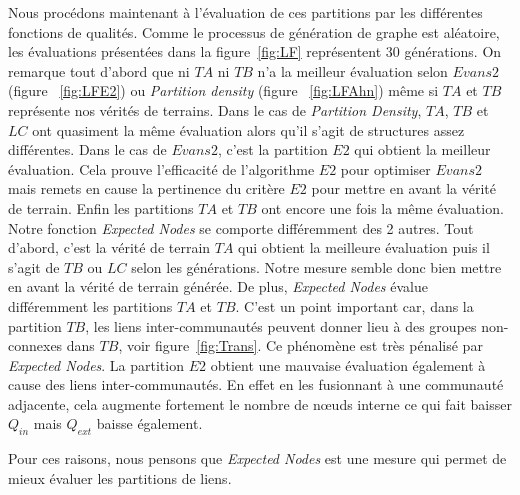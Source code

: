 Nous procédons maintenant à l'évaluation de ces partitions par les différentes fonctions de qualités.
Comme le processus de génération de graphe est aléatoire, les évaluations présentées dans la figure~\ref{fig:LF} représentent $30$ générations.
On remarque tout d'abord que ni $TA$ ni $TB$ n'a la meilleur évaluation selon $Evans2$ (figure ~\ref{fig:LFE2}) ou \emph{Partition density} (figure ~\ref{fig:LFAhn}) même si $TA$ et $TB$ représente nos vérités de terrains.
Dans le cas de \emph{Partition Density}, $TA$, $TB$ et $LC$ ont quasiment la même évaluation alors qu'il s'agit de structures assez différentes.
Dans le cas de $Evans2$, c'est la partition $E2$ qui obtient la meilleur évaluation.
Cela prouve l'efficacité de l'algorithme $E2$ pour optimiser $Evans2$ mais remets en cause la pertinence du critère $E2$ pour mettre en avant la vérité de terrain.
Enfin les partitions $TA$ et $TB$ ont encore une fois la même évaluation.
Notre fonction \emph{Expected Nodes} se comporte différemment des 2 autres.
Tout d'abord, c'est la vérité de terrain $TA$ qui obtient la meilleure évaluation puis il s'agit de $TB$ ou $LC$ selon les générations.
Notre mesure semble donc bien mettre en avant la vérité de terrain générée.
De plus, \emph{Expected Nodes} évalue différemment les partitions $TA$ et $TB$.
C'est un point important car, dans la partition $TB$, les liens inter-communautés peuvent donner lieu à des groupes non-connexes dans $TB$, voir figure~\ref{fig:Trans}.
Ce phénomène est très pénalisé par \emph{Expected Nodes}.
La partition $E2$ obtient une mauvaise évaluation également à cause des liens inter-communautés.
En effet en les fusionnant à une communauté adjacente, cela augmente fortement le nombre de n\oe uds interne ce qui fait baisser $Q_{in}$ mais $Q_{ext}$ baisse également.

Pour ces raisons, nous pensons que \emph{Expected Nodes} est une mesure qui permet de mieux évaluer les partitions de liens.

